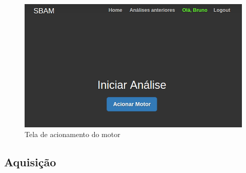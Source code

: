 \begin{figure}[h!]
	\centering
	\includegraphics[keepaspectratio=true,scale= 0.7]{figuras/acionarMotor.png}
	\caption{Tela de acionamento do motor}
	\label{acionamentoDoMotor}
\end{figure}
  


\subsection{Aquisição}